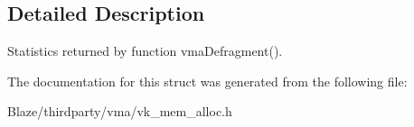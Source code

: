 \subsection{Detailed Description}
Statistics returned by function vma\+Defragment(). 

The documentation for this struct was generated from the following file\+:\begin{DoxyCompactItemize}
\item 
Blaze/thirdparty/vma/vk\+\_\+mem\+\_\+alloc.\+h\end{DoxyCompactItemize}
